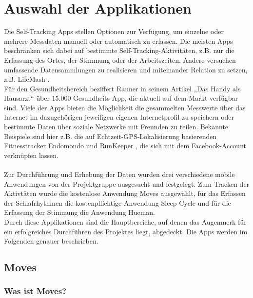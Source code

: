 
\chapter{Auswahl der Applikationen}
\label{ch:Apps}

Die Self-Tracking Apps stellen Optionen zur Verfügung, um einzelne oder mehrere Messdaten manuell oder automatisch zu erfassen. 
Die meisten Apps beschränken sich dabei auf bestimmte Self-Tracking-Aktivitäten, z.B. nur die Erfassung des Ortes, der Stimmung oder der Arbeitszeiten.
Andere versuchen umfassende Datensammlungen zu realisieren und miteinander Relation zu setzen, z.B. LifeMash \cite{sdf}. \\
Für den Gesundheitsbereich beziffert Rauner in seinem Artikel „Das Handy als Hausarzt“ \cite{web:Selbstvermesser} über 15.000 Gesundheits-App, die aktuell auf dem Markt verfügbar sind.
Viele der Apps bieten die Möglichkeit die gesammelten Messwerte über das Internet im dazugehörigen jeweiligen eigenen Internetprofil zu speichern oder bestimmte Daten über soziale Netzwerke mit Freunden zu teilen. 
Bekannte Beispiele sind hier z.B. die auf Echtzeit-GPS-Lokalisierung basierenden Fitnesstracker Endomondo \cite{web:Endomondo} und RunKeeper \cite{web:RunKeeper}, die sich mit dem Facebook-Account verknüpfen lassen. 
\\
\\
Zur Durchführung und Erhebung der Daten wurden drei verschiedene mobile Anwendungen von der Projektgruppe ausgesucht und festgelegt.
Zum Tracken der Aktivtäten wurde die kostenlose Anwendung Moves ausgewählt, für das Erfassen der Schlafrhythmen die kostenpflichtige Anwendung Sleep Cycle und für die Erfassung der Stimmung die Anwendung Hueman.\\
Durch diese Applikationen sind die Hauptbereiche, auf denen das Augenmerk für ein erfolgreiches Durchführen des Projektes liegt, abgedeckt.
Die Apps werden im Folgenden genauer beschrieben.


\section{Moves}
\label{ch:Apps:sec:Moves}

\subsection{Was ist Moves?}
\label{ch:Apps:sec:Moves:subsec:WIM}

